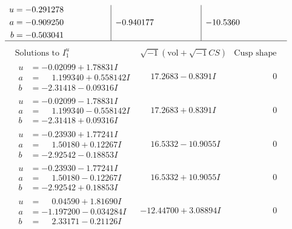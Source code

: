 \documentclass[1p]{elsarticle_modified}
\theoremstyle{definition}
\newcommand{\I}{\sqrt{-1}}
\begin{document}
$$\begin{array}{c|c|c}
\begin{aligned}
u &= -0.291278\phantom{ +0.000000I} \\
a &= -0.909250\phantom{ +0.000000I} \\
b &= -0.503041\phantom{ +0.000000I}\end{aligned}
 & -0.940177\phantom{ +0.000000I} & -10.5360\phantom{ +0.000000I}\\
 \hline 
 \end{array}$$\newpage$$\begin{array}{c|c|c}  
\text{Solutions to }I^u_{1}& \I (\text{vol} + \sqrt{-1}CS) & \text{Cusp shape}\\
 \hline 
\begin{aligned}
u &= -0.02099 + 1.78831 I \\
a &= \phantom{-}1.199340 + 0.558142 I \\
b &= -2.31418 - 0.09316 I\end{aligned}
 & \phantom{-}17.2683 - 0.8391 I & \phantom{-0.000000 } 0 \\ \hline\begin{aligned}
u &= -0.02099 - 1.78831 I \\
a &= \phantom{-}1.199340 - 0.558142 I \\
b &= -2.31418 + 0.09316 I\end{aligned}
 & \phantom{-}17.2683 + 0.8391 I & \phantom{-0.000000 } 0 \\ \hline\begin{aligned}
u &= -0.23930 + 1.77241 I \\
a &= \phantom{-}1.50180 + 0.12267 I \\
b &= -2.92542 - 0.18853 I\end{aligned}
 & \phantom{-}16.5332 - 10.9055 I & \phantom{-0.000000 } 0 \\ \hline\begin{aligned}
u &= -0.23930 - 1.77241 I \\
a &= \phantom{-}1.50180 - 0.12267 I \\
b &= -2.92542 + 0.18853 I\end{aligned}
 & \phantom{-}16.5332 + 10.9055 I & \phantom{-0.000000 } 0 \\ \hline\begin{aligned}
u &= \phantom{-}0.04590 + 1.81690 I \\
a &= -1.197200 - 0.034284 I \\
b &= \phantom{-}2.33171 - 0.21126 I\end{aligned}
 & -12.44700 + 3.08894 I & \phantom{-0.000000 } 0 \\ \hline\begin{aligned}

\end{aligned}
\end{array}$$
\end{document}
